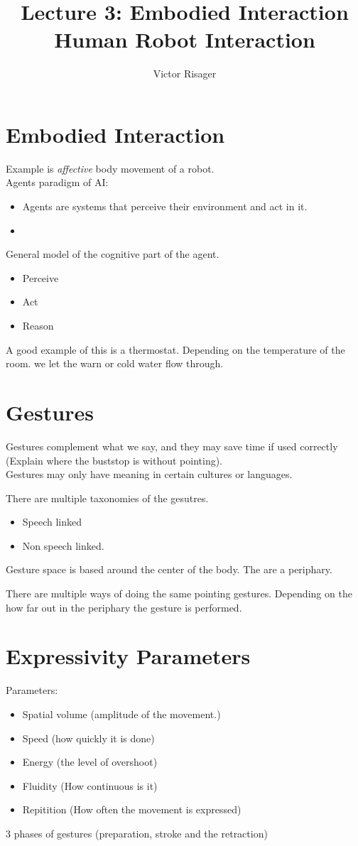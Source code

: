 \documentclass[a4paper]{article}
\title{Lecture 3: Embodied Interaction  \\
	\large Human Robot Interaction}
\author{Victor Risager}
\begin{document}
\maketitle

\section{Embodied Interaction}
Example is \textit{affective} body movement of a robot. \\
Agents paradigm of AI:
\begin{itemize}
	\item Agents are systems that perceive their environment and act in it.
	\item 
\end{itemize}
General model of the cognitive part of the agent. 

\begin{itemize}
	\item Perceive
	\item Act
	\item Reason
\end{itemize}
A good example of this is a thermostat. Depending on the temperature of the room. we let the warn or cold water flow through. 

\section{Gestures}
Gestures complement what we say, and they may save time if used correctly (Explain where the buststop is without pointing). \\
Gestures may only have meaning in certain cultures or languages. 

There are multiple taxonomies of the gesutres. 
\begin{itemize}
	\item Speech linked
		\item Non speech linked. 
\end{itemize}

Gesture space is based around the center of the body. The are a periphary. 

There are multiple ways of doing the same pointing gestures. Depending on the how far out in the periphary the gesture is performed. 

\section{Expressivity Parameters}
Parameters:
\begin{itemize}
	\item Spatial volume (amplitude of the movement.)
	\item Speed (how quickly it is done)
	\item Energy (the level of overshoot)
	\item Fluidity (How continuous is it)
	\item Repitition (How often the movement is expressed)
\end{itemize}
3 phases of gestures (preparation, stroke and the retraction)
\end{document}
